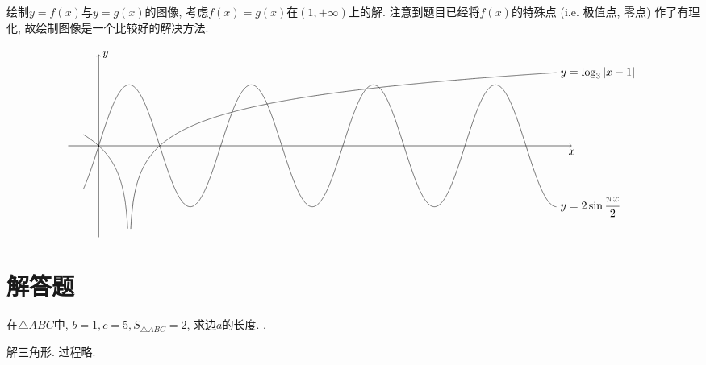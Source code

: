 \documentclass[8pt]{article}
\begin{document}
		绘制\(y=f(x)\)与\(y=g(x)\)的图像, 考虑\(f(x) = g(x)\)在\((1, +\infty)\)上的解. 注意到题目已经将\(f(x)\)的特殊点 (i.e. 极值点, 零点) 作了有理化, 故绘制图像是一个比较好的解决方法.

		\[
			\begin{tikzpicture}[scale = 0.95, baseline = 0]
				\draw[black, ->] (-1, 0)--(15.5, 0) node[below] {\(x\)};
				\draw[black, ->] (0, -3)--(0, 3) node[right] {\(y\)};
				\draw[black, domain = -0.5 : 15, samples = 2000] plot(\x, {2 * sin(deg(pi * \x / 2))}) node[right] {\(y=2\sin\dfrac{\pi x}{2}\)};
				\draw[black, domain = -0.5 : 0.95, samples = 2000] plot(\x, {ln(1 - \x) / ln(3)});
				\draw[black, domain = 1.05 : 15, samples = 2000] plot(\x, {ln(\x - 1) / ln(3)}) node[right] {\(y=\log_{3}\abs{x-1}\)};
			\end{tikzpicture}
		\]

	\section{解答题}

		在\(\triangle ABC\)中, \(b=1, c=5, S_{\triangle ABC}=2\), 求边\(a\)的长度. .

		解三角形. 过程略.
		~\\
\end{document}
